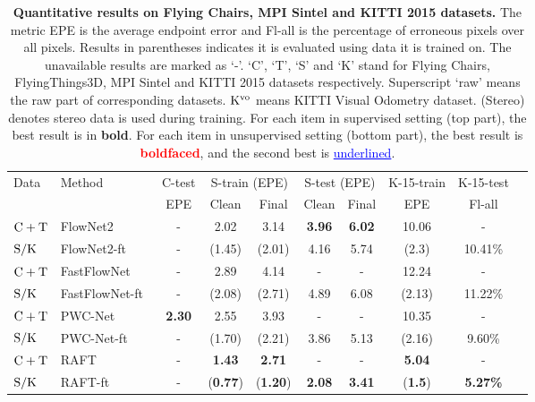 \documentclass[lettersize,journal]{IEEEtran}
\begin{document}
\begin{table*}[t]
	\caption{\textbf{Quantitative results on Flying Chairs, MPI Sintel and KITTI 2015 datasets.} The metric EPE is the average endpoint error and Fl-all is the percentage of erroneous pixels over all pixels. Results in parentheses indicates it is evaluated using data it is trained on. The unavailable results are marked as `-'. `C', `T', `S' and `K' stand for Flying Chairs, FlyingThings3D, MPI Sintel and KITTI 2015 datasets respectively. Superscript `raw' means the raw part of corresponding datasets. $\rm K^{vo}$ means KITTI Visual Odometry dataset. (Stereo) denotes stereo data is used during training. For each item in supervised setting (top part), the best result is in \textbf{bold}. For each item in unsupervised setting (bottom part), the best result is \textcolor{red}{\textbf{boldfaced}}, and the second best is \textcolor{blue}{\underline{underlined}}.}
	\label{tab:3}
	\centering
	\renewcommand{\arraystretch}{1.1}
	\tabcolsep=4.4mm
	\begin{tabular}{llcccccccc}
		\toprule
		\multirow{2}{*}{Data} & \multirow{2}{*}{Method} & \multicolumn{1}{c}{C-test} & \multicolumn{2}{c}{S-train (EPE)} & \multicolumn{2}{c}{S-test (EPE)} & \multicolumn{1}{c}{K-15-train} & \multicolumn{1}{c}{K-15-test}\\
		\cmidrule(lr){3-3}
		\cmidrule(lr){4-5}
		\cmidrule(lr){6-7}
		\cmidrule(lr){8-8}
		\cmidrule(lr){9-9}
		& & EPE & Clean & Final & Clean & Final & EPE & Fl-all \\
		\midrule
		$\rm C+T$ & FlowNet2~\cite{8099662} & - & 2.02 & 3.14 & \textbf{3.96} & \textbf{6.02} & 10.06 & - \\
		$\rm S/K$ & FlowNet2-ft~\cite{8099662} & - & (1.45) & (2.01) & 4.16 & 5.74 & (2.3) & 10.41\% \\
		$\rm C+T$ & FastFlowNet~\cite{Kong_2021_ICRA} & - & 2.89 & 4.14 & - & - & 12.24 & - \\
		$\rm S/K$ & FastFlowNet-ft~\cite{Kong_2021_ICRA} & - & (2.08) & (2.71) & 4.89 & 6.08 & (2.13) & 11.22\% \\
		$\rm C+T$ & PWC-Net~\cite{8579029} & \textbf{2.30} & 2.55 & 3.93 & - & - & 10.35 & - \\ 
		$\rm S/K$ & PWC-Net-ft~\cite{8579029} & - & (1.70) & (2.21) & 3.86 & 5.13 & (2.16) & 9.60\% \\
		$\rm C+T$ & RAFT~\cite{teed2020raft} & - & \textbf{1.43} & \textbf{2.71} & - & - & \textbf{5.04} & - \\
		$\rm S/K$ & RAFT-ft~\cite{teed2020raft} & - & (\textbf{0.77}) & (\textbf{1.20}) & \textbf{2.08} & \textbf{3.41} & (\textbf{1.5}) & \textbf{5.27\%} \\

\end{tabular}
\end{table*}
\end{document}

